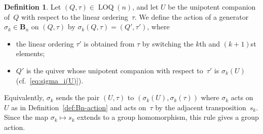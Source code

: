 \documentclass[11pt, letterpaper]{amsart}
\theoremstyle{definition}
\newtheorem{definition}[theorem]{Definition}
\numberwithin{equation}{section}
\newcommand\LOQ{\operatorname{LOQ}}
\begin{document}
\begin{definition}
\label{def:Bn-acts-on-COQ}
Let ${(Q,\tau)\in\LOQ(n)}$, and let $U$ be the unipotent companion of~$Q$ with respect to the linear ordering~$\tau$.
We define the action of a generator $\sigma_k\in\mathbf{B}_n$ on $(Q,\tau)$ by 
$\sigma_k(Q,\tau)=(Q',\tau')$, 
where 
\begin{itemize}[leftmargin=.2in]
\item 
the linear ordering $\tau'$ is obtained from $\tau$ by switching the $k$th and $(k+1)$st elements; 
\item
$Q'$ is the quiver whose unipotent companion with respect to~$\tau'$ is $\sigma_k(U)$ (cf.~\eqref{eq:sigma_i(U)}). 
\end{itemize}
Equivalently, $\sigma_k$ sends the pair $(U,\tau)$ to $(\sigma_k(U), \sigma_k(\tau))$
where $\sigma_k$ acts on $U$ as in Definition~\ref{def:Bn-action}
and acts on~$\tau$ by the adjacent transposition~$s_k$. 
Since the map $\sigma_k\mapsto s_k$ extends to a group homomorphism,
this rule gives a group action. 
\end{definition}
\end{document}

